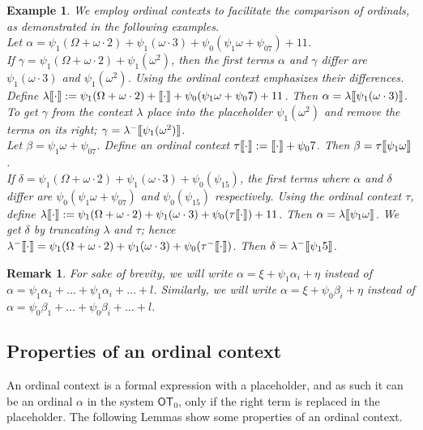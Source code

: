 \documentclass{amsart}
\theoremstyle{plain}
\theoremstyle{plain}
\newtheorem{remark}[theorem]{Remark}
\newtheorem{example}[theorem]{Example}
\def\scbrl{[\hspace{-.14em}[}
\def\scbrr{]\hspace{-.14em}]}
\def\scbr#1{\scbrl#1\scbrr}
\newcommand\OT{\mathsf{OT}}
\newcommand{\Om}{{\Omega}}
\newcommand{\al}{{\alpha}}
\newcommand{\be}{{\beta}}
\newcommand{\ga}{\gamma}
\newcommand{\de}{\delta}
\newcommand{\la}{\lambda}
\newcommand{\om}{\omega}
\def\scbrl{[\hspace{-.14em}[}
\def\scbrr{]\hspace{-.14em}]}
\def\scbr#1{\scbrl#1\scbrr}
\begin{document}
\begin{example}
We employ ordinal contexts to facilitate the comparison of ordinals, as demonstrated in the following examples.\\
Let  $\al= \psi_1{(\Om + \om\cdot 2)} + \psi_1{(\om\cdot 3)}  + \psi_0{(\psi_1 \om + \psi_07)}+ 11$.\medskip
\\
If $\ga = \psi_1{(\Om+ \om\cdot 2)} + \psi_1{(\om^2)}$, then the first terms $\al$ and $\ga$ differ are $\psi_1{(\om\cdot 3)}$ and $\psi_1(\om^2)$. Using the ordinal context  emphasizes their differences. \\
Define $\la\scbr{\cdot} :=  \psi_1{(\Om + \om\cdot 2)} + \scbr{\cdot} + \psi_0{(\psi_1 \om + \psi_07)} +11$. Then $\al = \la\scbr{\psi_1{(\om\cdot 3)}}$. To get $\ga$ from the context $\la$ place into the placeholder $\psi_1{(\om^2)}$ and remove the terms on its right; $\ga = \la^-\scbr{\psi_1{(\om^2})}$.\medskip
\\
Let $\be = \psi_1\om + \psi_07$. 
Define an ordinal context $\tau\scbr{\cdot} :=\scbr{\cdot} + \psi_07$. Then $\be = \tau\scbr{\psi_1\om}$.
\\
If $\de = \psi_1{(\Om + \om\cdot 2)} + \psi_1{(\om\cdot 3)}  +  \psi_0{(\psi_15 )}$, the first terms where $\al$ and $\de$ differ are $\psi_0(\psi_1 \om + \psi_07)$ and $\psi_0{(\psi_15 )}$ respectively.
Using the ordinal context $\tau$, 
define $\la\scbr{\cdot} := \psi_1{(\Om + \om \cdot 2)} + \psi_1{(\om\cdot 3)} + \psi_0(\tau\scbr{\cdot}) + 11$. Then $\al = \la\scbr{\psi_1\om}$. 
We get $\de$ by truncating $\la$ and  $\tau$; hence\\
$\la^-\scbr{\cdot} =  \psi_1{(\Om + \om \cdot 2)} + \psi_1{(\om\cdot 3)} + \psi_0(\tau^-\scbr{\cdot})$. Then $\de = \la^-\scbr{\psi_15}$.
\\
\end{example}


\begin{remark}
For sake of brevity, we will write $\al = \xi + \psi_1\al_i + \eta$ instead of $\al =\psi_1{\al_1}+\ldots+\psi_1\al_i +\ldots +l$. 
Similarly, we will write $\al= \xi + \psi_0\be_i +\eta$ instead of $\al =\psi_0{\be_1}+\ldots+\psi_0\be_i +\ldots +l$.
\end{remark}

\smallskip
\subsection{Properties of an ordinal context}
An ordinal context is a formal expression with a placeholder, and as such it can be an ordinal $\al$ in the system $\OT_0$, only if the right term is replaced in the placeholder. The following Lemmas show some properties of an ordinal context.\medskip
\end{document}
